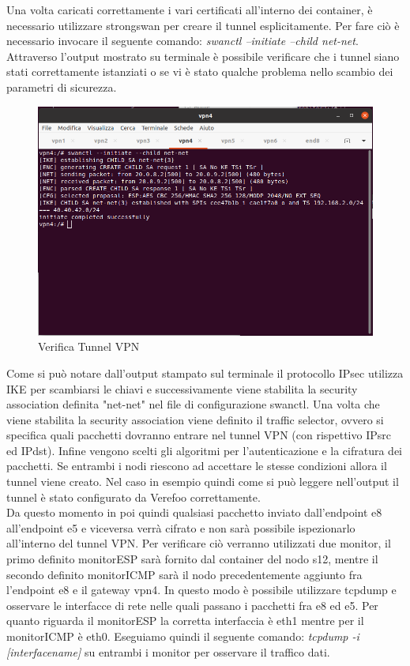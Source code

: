 \newpage

Una volta caricati correttamente i vari certificati all'interno dei container, è necessario utilizzare strongswan per creare il tunnel esplicitamente. Per fare ciò è necessario invocare il seguente comando:
\textit{swanctl --initiate --child net-net}. Attraverso l'output mostrato su terminale è possibile verificare che i tunnel siano stati correttamente istanziati o se vi è stato qualche problema nello scambio dei parametri
di sicurezza.
\begin{figure}[h] 
    \centering
    \includegraphics[width=1\textwidth]{(03)VPNConnectionEstablished.png} 
    \caption{Verifica Tunnel VPN}
    \label{fig:VPNDeploy}
\end{figure}

Come si può notare dall'output stampato sul terminale il protocollo IPsec utilizza IKE per scambiarsi le chiavi e successivamente viene stabilita la security association 
definita "net-net" nel file di configurazione swanctl. Una volta che viene stabilita la security association viene definito il traffic selector, ovvero si specifica quali pacchetti dovranno
entrare nel tunnel VPN (con rispettivo IPsrc ed IPdst). Infine vengono scelti gli algoritmi per l'autenticazione e la cifratura dei pacchetti. Se entrambi i nodi riescono ad accettare le stesse condizioni allora il tunnel viene creato.
Nel caso in esempio quindi come si può leggere nell'output il tunnel è stato configurato da Verefoo correttamente.
\\
Da questo momento in poi quindi qualsiasi pacchetto inviato dall'endpoint e8 all'endpoint e5 e viceversa verrà cifrato e non sarà possibile ispezionarlo all'interno del tunnel VPN. Per verificare ciò verranno utilizzati due monitor, 
il primo definito monitorESP sarà fornito dal container del nodo s12, mentre il secondo definito monitorICMP sarà il nodo precedentemente aggiunto fra l'endpoint e8 e il gateway vpn4. In questo modo è possibile utilizzare tcpdump e osservare le interfacce di rete nelle quali passano i pacchetti fra e8 ed e5.  
Per quanto riguarda il monitorESP la corretta interfaccia è eth1 mentre per il monitorICMP è eth0. 
Eseguiamo quindi il seguente comando: \textit{ tcpdump -i [interfacename]} su entrambi i monitor per osservare il traffico dati.

